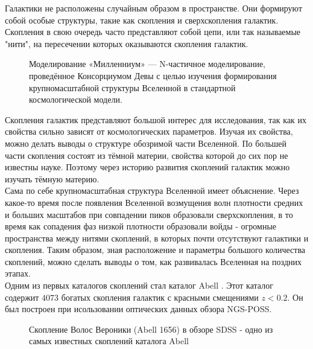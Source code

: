 \Introduction

Галактики не расположены случайным образом в пространстве. Они формируют собой особые структуры, 
такие как скопления и сверхскопления галактик. Скопления в свою очередь часто представляют собой цепи, 
или так называемые "нити", на пересечении которых оказываются скопления галактик.\\

\begin{figure}
    \caption{Моделирование «Милленниум» — N-частичное моделирование, проведённое Консорциумом 
        Девы с целью изучения формирования крупномасштабной структуры Вселенной в стандартной
        космологической модели.}
\end{figure}

Скопления галактик представляют большой интерес для исследования, так как их свойства сильно зависят 
от космологических параметров. Изучая их свойства, можно делать выводы о структуре обозримой части 
Вселенной. По большей части скопления состоят из тёмной материи, свойства которой до сих пор не 
известны науке. Поэтому через историю развития скоплений галактик можно изучать тёмную материю.\\

Сама по себе крупномасштабная структура Вселенной имеет объяснение. Через какое-то время после 
появления Вселенной возмущения волн плотности средних и больших масштабов при совпадении пиков 
образовали сверхскопления, в то время как сопадения фаз низкой плотности образовали войды - 
огромные пространства между нитями скоплений, в которых почти отсутствуют галактики и скопления. 
Таким образом, зная расположение и параметры большого количества скоплений, можно сделать выводы о 
том, как развивалась Вселенная на поздних этапах. \cite{Planck}\\

Одним из первых каталогов скоплений стал каталог Abell \cite{Abell}. Этот каталог содержит $4073$ 
богатых скопления галактик с красными смещениями $z < 0.2$. Он был построен при исользовании 
оптических данных обзора NGS-POSS.\\

\begin{figure}
    \caption{Скопление Волос Вероники (Abell 1656) в обзоре SDSS - одно из самых известных 
        скоплений каталога Abell}
\end{figure}

